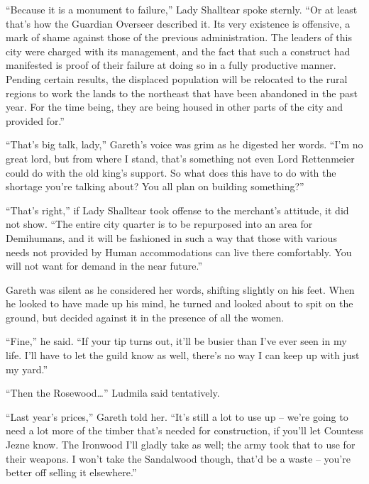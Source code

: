  

“Because it is a monument to failure,” Lady Shalltear spoke sternly. “Or at least that’s how the Guardian Overseer described it. Its very existence is offensive, a mark of shame against those of the previous administration. The leaders of this city were charged with its management, and the fact that such a construct had manifested is proof of their failure at doing so in a fully productive manner. Pending certain results, the displaced population will be relocated to the rural regions to work the lands to the northeast that have been abandoned in the past year. For the time being, they are being housed in other parts of the city and provided for.”

 

“That’s big talk, lady,” Gareth’s voice was grim as he digested her words. “I’m no great lord, but from where I stand, that’s something not even Lord Rettenmeier could do with the old king’s support. So what does this have to do with the shortage you’re talking about? You all plan on building something?”

 

“That’s right,” if Lady Shalltear took offense to the merchant’s attitude, it did not show. “The entire city quarter is to be repurposed into an area for Demihumans, and it will be fashioned in such a way that those with various needs not provided by Human accommodations can live there comfortably. You will not want for demand in the near future.”

 

Gareth was silent as he considered her words, shifting slightly on his feet. When he looked to have made up his mind, he turned and looked about to spit on the ground, but decided against it in the presence of all the women.

 

“Fine,” he said. “If your tip turns out, it’ll be busier than I’ve ever seen in my life. I’ll have to let the guild know as well, there’s no way I can keep up with just my yard.”

 

“Then the Rosewood…” Ludmila said tentatively.

 

“Last year’s prices,” Gareth told her. “It’s still a lot to use up – we’re going to need a lot more of the timber that’s needed for construction, if you’ll let Countess Jezne know. The Ironwood I’ll gladly take as well; the army took that to use for their weapons. I won’t take the Sandalwood though, that’d be a waste – you’re better off selling it elsewhere.”

